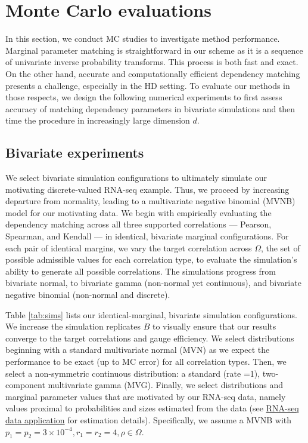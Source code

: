 \documentclass[
]{jss}
\begin{document}
\clearpage

\hypertarget{simulations}{%
\section{Monte Carlo evaluations}\label{simulations}}

In this section, we conduct MC studies to investigate method performance. Marginal parameter matching is straightforward in our scheme as it is a sequence of univariate inverse probability transforms. This process is both fast and exact. On the other hand, accurate and computationally efficient dependency matching presents a challenge, especially in the HD setting. To evaluate our methods in those respects, we design the following numerical experiments to first assess accuracy of matching dependency parameters in bivariate simulations and then time the procedure in increasingly large dimension \(d\).

\hypertarget{bivariate-experiments}{%
\subsection{Bivariate experiments}\label{bivariate-experiments}}

We select bivariate simulation configurations to ultimately simulate our motivating discrete-valued RNA-seq example. Thus, we proceed by increasing departure from normality, leading to a multivariate negative binomial (MVNB) model for our motivating data. We begin with empirically evaluating the dependency matching across all three supported correlations --- Pearson, Spearman, and Kendall --- in identical, bivariate marginal configurations. For each pair of identical margins, we vary the target correlation across \(\Omega\), the set of possible admissible values for each correlation type, to evaluate the simulation's ability to generate all possible correlations. The simulations progress from bivariate normal, to bivariate gamma (non-normal yet continuous), and bivariate negative binomial (non-normal and discrete).

Table \ref{tab:sims} lists our identical-marginal, bivariate simulation configurations. We increase the simulation replicates \(B\) to visually ensure that our results converge to the target correlations and gauge efficiency. We select distributions beginning with a standard multivariate normal (MVN) as we expect the performance to be exact (up to MC error) for all correlation types. Then, we select a non-symmetric continuous distribution: a standard (rate =1), two-component multivariate gamma (MVG). Finally, we select distributions and marginal parameter values that are motivated by our RNA-seq data, namely values proximal to probabilities and sizes estimated from the data (see \href{examples}{RNA-seq data application} for estimation details). Specifically, we assume a MVNB with \(p_1 = p_2 = 3\times10^{-4}, r_1 = r_2 = 4, \rho \in \Omega\).
\end{document}

